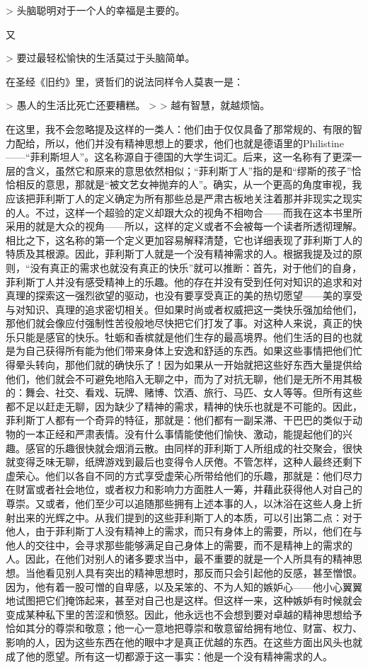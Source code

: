 \documentclass[12pt,oneside]{book}
\begin{document}
> 头脑聪明对于一个人的幸福是主要的。 

又 

> 要过最轻松愉快的生活莫过于头脑简单。 

 

在圣经《旧约》里，贤哲们的说法同样令人莫衷一是： 

> 愚人的生活比死亡还要糟糕。
>
> 越有智慧，就越烦恼。 

 

在这里，我不会忽略提及这样的一类人：他们由于仅仅具备了那常规的、有限的智力配给，所以，他们并没有精神思想上的要求，他们也就是德语里的Philistine——“菲利斯坦人”。这名称源自于德国的大学生词汇。后来，这一名称有了更深一层的含义，虽然它和原来的意思依然相似；“菲利斯丁人”指的是和“缪斯的孩子”恰恰相反的意思，那就是“被文艺女神抛弃的人”。确实，从一个更高的角度审视，我应该把菲利斯丁人的定义确定为所有那些总是严肃古板地关注着那并非现实之现实的人。不过，这样一个超验的定义却跟大众的视角不相吻合——而我在这本书里所采用的就是大众的视角——所以，这样的定义或者不会被每一个读者所透彻理解。相比之下，这名称的第一个定义更加容易解释清楚，它也详细表现了菲利斯丁人的特质及其根源。因此，菲利斯丁人就是一个没有精神需求的人。根据我提及过的原则，“没有真正的需求也就没有真正的快乐”就可以推断：首先，对于他们的自身，菲利斯丁人并没有感受精神上的乐趣。他的存在并没有受到任何对知识的追求和对真理的探索这一强烈欲望的驱动，也没有要享受真正的美的热切愿望——美的享受与对知识、真理的追求密切相关。但如果时尚或者权威把这一类快乐强加给他们，那他们就会像应付强制性苦役般地尽快把它们打发了事。对这种人来说，真正的快乐只能是感官的快乐。牡蛎和香槟就是他们生存的最高境界。他们生活的目的也就是为自己获得所有能为他们带来身体上安逸和舒适的东西。如果这些事情把他们忙得晕头转向，那他们就的确快乐了！因为如果从一开始就把这些好东西大量提供给他们，他们就会不可避免地陷入无聊之中，而为了对抗无聊，他们是无所不用其极的：舞会、社交、看戏、玩牌、赌博、饮酒、旅行、马匹、女人等等。但所有这些都不足以赶走无聊，因为缺少了精神的需求，精神的快乐也就是不可能的。因此，菲利斯丁人都有一个奇异的特征，那就是：他们都有一副呆滞、干巴巴的类似于动物的一本正经和严肃表情。没有什么事情能使他们愉快、激动，能提起他们的兴趣。感官的乐趣很快就会烟消云散。由同样的菲利斯丁人所组成的社交聚会，很快就变得乏味无聊，纸牌游戏到最后也变得令人厌倦。不管怎样，这种人最终还剩下虚荣心。他们以各自不同的方式享受虚荣心所带给他们的乐趣，那就是：他们尽力在财富或者社会地位，或者权力和影响力方面胜人一筹，并藉此获得他人对自己的尊崇。又或者，他们至少可以追随那些拥有上述本事的人，以沐浴在这些人身上折射出来的光辉之中。从我们提到的这些菲利斯丁人的本质，可以引出第二点：对于他人，由于菲利斯丁人没有精神上的需求，而只有身体上的需要，所以，他们在与他人的交往中，会寻求那些能够满足自己身体上的需要，而不是精神上的需求的人。因此，在他们对别人的诸多要求当中，最不重要的就是一个人所具有的精神思想。当他看见别人具有突出的精神思想时，那反而只会引起他的反感，甚至憎恨。因为，他有着一股可憎的自卑感，以及呆笨的、不为人知的嫉妒心——他小心翼翼地试图把它们掩饰起来，甚至对自己也是这样。但这样一来，这种嫉妒有时候就会变成某种私下里的苦涩和愤怒。因此，他永远也不会想到要对卓越的精神思想给予恰如其分的尊崇和敬意；他一心一意地把尊崇和敬意留给拥有地位、财富、权力、影响的人，因为这些东西在他的眼中才是真正优越的东西。在这些方面出风头也就成了他的愿望。所有这一切都源于这一事实：他是一个没有精神需求的人。 
\end{document}
